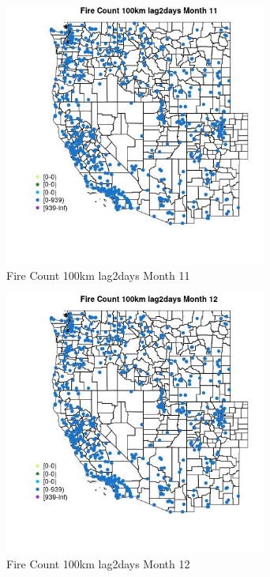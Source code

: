 \begin{figure} 
\centering  
\includegraphics[width=0.77\textwidth]{Code_Outputs/Report_ML_input_PM25_Step4_part_e_de_duplicated_aves_compiled_2019-05-21wNAs_MapObsMo11Fire_Count_100km_lag2days.jpg} 
\caption{\label{fig:Report_ML_input_PM25_Step4_part_e_de_duplicated_aves_compiled_2019-05-21wNAsMapObsMo11Fire_Count_100km_lag2days}Fire Count 100km lag2days Month 11} 
\end{figure} 
 

\begin{figure} 
\centering  
\includegraphics[width=0.77\textwidth]{Code_Outputs/Report_ML_input_PM25_Step4_part_e_de_duplicated_aves_compiled_2019-05-21wNAs_MapObsMo12Fire_Count_100km_lag2days.jpg} 
\caption{\label{fig:Report_ML_input_PM25_Step4_part_e_de_duplicated_aves_compiled_2019-05-21wNAsMapObsMo12Fire_Count_100km_lag2days}Fire Count 100km lag2days Month 12} 
\end{figure} 
 

